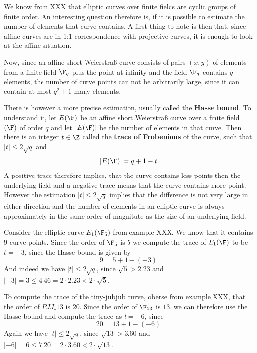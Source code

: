 We know from XXX that elliptic curves over finite fields are cyclic groups of finite order. An interesting question therefore is, if it is possible to estimate the number of elements that curve contains. A first thing to note is then that, since affine curves are in 1:1 correspondence with projective curves, it is enough to look at the affine situation. 

Now, since an affine short Weierstraß curve consists of pairs $(x,y)$ of elements from a finite field $\F_q$ plus the point at infinity and the field $\F_q$ contains $q$ elements, the number of curve points can not be arbitrarily large, since it can contain at most $q^2+1$ many elements. 

There is however a more precise estimation, usually called the \textbf{Hasse bound}. To understand it, let $E(\F)$ be an affine short Weierstraß curve over a finite field $(\F)$ of order $q$ and let $|E(\F)|$ be the number of elements in that curve. Then there is an integer $t\in \Z$ called the \textbf{trace of Frobenious} of the curve, such that $|t| \leq 2\sqrt{q}$ and
\begin{equation}
|E(\F)| = q +1 -t
\end{equation}
A positive trace therefore implies, that the curve contains less points then the underlying field and a negative trace means that the curve contains more point. However the estimation $|t| \leq 2\sqrt{q}$ implies that the difference is not very large in either direction and the number of elements in an elliptic curve is always approximately in the same order of magnitute as the size of an underlying field.
\begin{example} Consider the elliptic curve $E_1(\F_5)$ from example XXX. We know that it contains $9$ curve points. Since the order of $\F_5$ is $5$ we compute the trace of $E_1(\F)$ to be $t=-3$, since the Hasse bound is given by
$$
9 = 5 + 1 - (-3)
$$
And indeed we have $|t| \leq 2\sqrt{q}$, since $\sqrt{5}> 2.23$ and 
$|-3|= 3 \leq 4.46 = 2\cdot 2.23< 2\cdot \sqrt{5}$.
\end{example}
\begin{example} To compute the trace of the tiny-jubjub curve, oberse from example XXX, that the order of $\mathit{PJJ\_13}$ is $20$. Since the order of $\F_{13}$ is $13$, we can therefore use the Hasse bound and compute the trace as $t=-6$, since
$$
20 = 13 + 1 - (-6)
$$
Again we have $|t| \leq 2\sqrt{q}$, since $\sqrt{13}> 3.60$ and 
$|-6|= 6 \leq 7.20 = 2\cdot 3.60< 2\cdot \sqrt{13}$.
\end{example}
